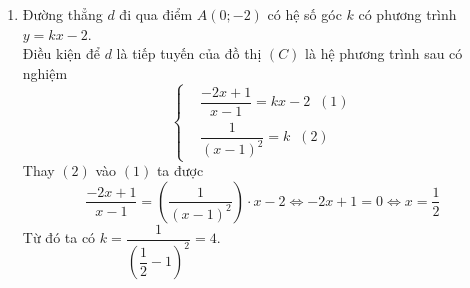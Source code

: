 \begin{bt}
{\begin{enumerate}
\begin{itemize}
\begin{center}
				\end{center}
			\end{itemize}
			\item 
			Đường thẳng $d$ đi qua điểm $A(0;-2)$ có hệ số góc $k$ có phương trình $y=kx-2$.\\
			Điều kiện để $d$ là tiếp tuyến của đồ thị $(C)$ là hệ phương trình sau có nghiệm
			$$ \left\{\begin{aligned}
			&\dfrac{-2x+1}{x-1}=kx-2\;\; (1)\\ 
			&\dfrac{1}{\left(x-1\right)^2}=k\;\;(2)
			\end{aligned}\right. $$
			Thay $(2)$ vào $(1)$ ta được
			$$\dfrac{-2x+1}{x-1}=\left(\dfrac{1}{\left(x-1\right)^2}\right)\cdot x-2\Leftrightarrow -2x+1=0 \Leftrightarrow x=\dfrac{1}{2}$$
			Từ đó ta có $k=\dfrac{1}{\left(\dfrac{1}{2}-1\right)^2}=4$.
		\end{enumerate}
	}
\end{bt}

